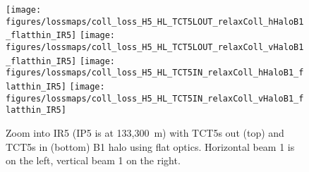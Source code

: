 \begin{figure}
\begin{center}
\vskip-12mm
\texttt{[image: figures/lossmaps/coll\_loss\_H5\_HL\_TCT5LOUT\_relaxColl\_hHaloB1\_flatthin\_IR5]}
\texttt{[image: figures/lossmaps/coll\_loss\_H5\_HL\_TCT5LOUT\_relaxColl\_vHaloB1\_flatthin\_IR5]}
\texttt{[image: figures/lossmaps/coll\_loss\_H5\_HL\_TCT5IN\_relaxColl\_hHaloB1\_flatthin\_IR5]}
\texttt{[image: figures/lossmaps/coll\_loss\_H5\_HL\_TCT5IN\_relaxColl\_vHaloB1\_flatthin\_IR5]}
\end{center}
\vspace{-0.3cm}
 \caption{Zoom into IR5 (IP5 is at 133,300~m) with TCT5s out (top) and TCT5s in (bottom) B1 halo using flat optics. Horizontal beam 1 is on the left, vertical beam 1 on the right.
  \label{IR5_flatB1}}
\end{figure}
